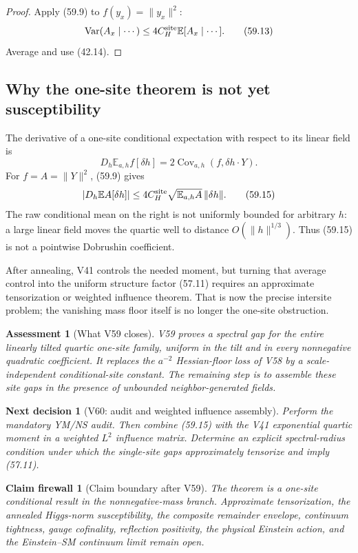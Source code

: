 \documentclass[11pt]{article}
\newtheorem{firewall}[theorem]{Claim firewall}
\newtheorem{decision}[theorem]{Next decision}
\newtheorem{assessment}[theorem]{Assessment}
\theoremstyle{remark}
\begin{document}
\begin{proof}
Apply (59.9) to \(f(y_x)=\|y_x\|^2\):
\[
 \operatorname{Var}(A_x\mid\cdots)
 \leq
 4C_H^{\rm site}
 \mathbb E[A_x\mid\cdots].                        \tag{59.13}
\]
Average and use (42.14).
\end{proof}

\subsection{Why the one-site theorem is not yet susceptibility}

The derivative of a one-site conditional expectation with respect to
its linear field is
\[
 D_h\mathbb E_{a,h}f[\delta h]
 =
 2\operatorname{Cov}_{a,h}(f,\delta h\cdot Y).    \tag{59.14}
\]
For \(f=A=\|Y\|^2\), (59.9) gives
\[
 |D_h\mathbb E A[\delta h]|
 \leq
 4C_H^{\rm site}
 \sqrt{\mathbb E_{a,h}A}\,\|\delta h\|.           \tag{59.15}
\]
The raw conditional mean on the right is not uniformly bounded for
arbitrary \(h\): a large linear field moves the quartic well to
distance \(O(\|h\|^{1/3})\).  Thus (59.15) is not a pointwise
Dobrushin coefficient.

After annealing, V41 controls the needed moment, but turning that
average control into the uniform structure factor (57.11) requires an
approximate tensorization or weighted influence theorem.  That is now
the precise intersite problem; the vanishing mass floor itself is no
longer the one-site obstruction.

\begin{assessment}[What V59 closes]
\label{ass:v17v59-status}
V59 proves a spectral gap for the entire linearly tilted quartic
one-site family, uniform in the tilt and in every nonnegative quadratic
coefficient.  It replaces the \(a^{-2}\) Hessian-floor loss of V58 by
a scale-independent conditional-site constant.  The remaining step is
to assemble these site gaps in the presence of unbounded
neighbor-generated fields.
\end{assessment}

\begin{decision}[V60: audit and weighted influence assembly]
\label{dec:v17v59-next}
Perform the mandatory YM/NS audit.  Then combine (59.15) with the V41
exponential quartic moment in a weighted \(L^2\) influence matrix.
Determine an explicit spectral-radius condition under which the
single-site gaps approximately tensorize and imply (57.11).
\end{decision}

\begin{firewall}[Claim boundary after V59]
\label{fire:v17v59}
The theorem is a one-site conditional result in the
nonnegative-mass branch.  Approximate tensorization, the annealed
Higgs-norm susceptibility, the composite remainder envelope,
continuum tightness, gauge cofinality, reflection positivity, the
physical Einstein action, and the Einstein--SM continuum limit remain
open.
\end{firewall}
\end{document}
